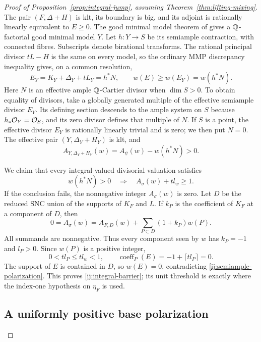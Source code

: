 \begin{proof}[Proof of Proposition~\ref{prop:integral-jump}, assuming
Theorem~\ref{thm:lifting-mixing}]
The pair $(F,\Delta+H)$ is klt, its boundary is big, and its adjoint
is rationally linearly equivalent to $E\ge0$.  The good minimal
model theorem of \cite{BCHM} gives a $\mathbb Q$-factorial good minimal
model $Y$.  Let $h:Y\to S$ be its semiample contraction, with
connected fibres.  Subscripts denote birational transforms.
The rational principal divisor $tL-H$ is the same on every model,
so the ordinary MMP discrepancy inequality gives, on a common
resolution,
\begin{equation}
\label{ij:semiample-polarization}
 E_Y=K_Y+\Delta_Y+tL_Y=h^*N,
 \qquad w(E)\ge w(E_Y)=w(h^*N).
\end{equation}
Here $N$ is an effective ample $\mathbb Q$-Cartier divisor when
$\dim S>0$.  To obtain equality of divisors, take a globally
generated multiple of the effective semiample divisor $E_Y$.
Its defining section descends to the ample system on $S$ because
$h_*\mathcal O_Y=\mathcal O_S$, and its zero divisor defines that multiple of
$N$.  If $S$ is a point, the effective divisor $E_Y$ is rationally
linearly trivial and is zero; we then put $N=0$.
The effective pair $(Y,\Delta_Y+H_Y)$ is klt, and
\begin{equation}
\label{ij:ordinary-discrepancy}
 A_{Y,\Delta_Y+H_Y}(w)=A_\psi(w)-w(h^*N)>0.
\end{equation}

We claim that every integral-valued divisorial valuation satisfies
\begin{equation}
\label{ij:integral-barrier}
 w(h^*N)>0\quad\Longrightarrow\quad A_\sigma(w)+t l_w\ge1.
\end{equation}
If the conclusion fails, the nonnegative integer $A_\sigma(w)$ is
zero.  Let $D$ be the reduced SNC union of the supports of $K_F$
and $L$.  If $k_P$ is the coefficient of $K_F$ at a component of
$D$, then
\[
 0=A_\sigma(w)
   =A_{F,D}(w)+\sum_{P\subset D}(1+k_P)w(P).
\]
All summands are nonnegative.  Thus every component seen by $w$
has $k_P=-1$ and $l_P>0$.  Since $w(P)$ is a positive integer,
\[
 0<t l_P\le t l_w<1,
 \qquad \operatorname{coeff}_P(E)=-1+\lceil t l_P\rceil=0.
\]
The support of $E$ is contained in $D$, so $w(E)=0$, contradicting
\eqref{ij:semiample-polarization}.  This proves
\eqref{ij:integral-barrier}; its unit threshold is exactly where
the index-one hypothesis on $\eta_F$ is used.

\subsection{A uniformly positive base polarization}


\end{proof}
